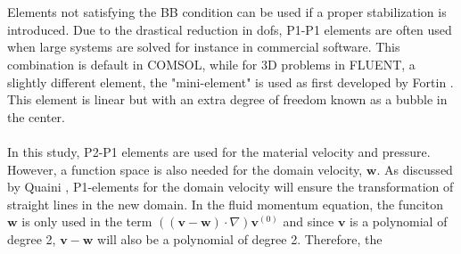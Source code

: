 \\
\\
Elements not satisfying the BB condition can be used if a proper stabilization is introduced. Due to the drastical reduction in dofs, P1-P1 elements are often used when large systems are solved for instance in commercial software. This combination is default in COMSOL, while for 3D problems in FLUENT, a slightly different element, the "mini-element" is used as first developed by Fortin \cite{Fort81}. This element is linear but with an extra degree of freedom known as a bubble in the center. 
\\
\\
In this study, P2-P1 elements are used for the material velocity and pressure. However, a function space is also needed for the domain velocity, $\mathbf{w}$. As discussed by Quaini \cite{Quai09}, P1-elements for the domain velocity will ensure the transformation of straight lines in the new domain. In the fluid momentum equation, the funciton $\mathbf{w}$ is only used in the term $((\mathbf{v}-\mathbf{w})\cdot \nabla) \mathbf{v}^{(0)}$ and since $\mathbf{v}$ is a polynomial of degree 2, $\mathbf{v}-\mathbf{w}$ will also be a polynomial of degree 2. Therefore, the 


